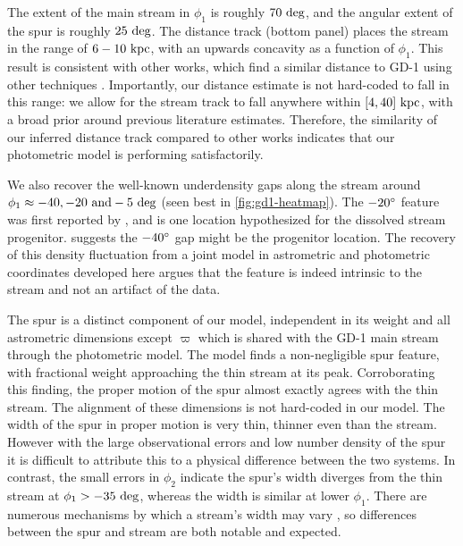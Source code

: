 \documentclass[twocolumn]{aastex631}
\newcommand{\stream}[1]{#1}
\newcommand{\parallax}{\varpi}
\begin{document}
        The extent of the main stream in $\phi_1$ is roughly $70~\rm{deg}$, and
        the angular extent of the spur is roughly $25~\rm{deg}$. The distance
        track (bottom panel) places the stream in the range of $6-10~\rm{kpc}$,
        with an upwards concavity as a function of $\phi_1$. This result is
        consistent with other works, which find a similar distance to
        \stream{GD-1} using other techniques \citep{deBoer+2020, Ibata+2021}.
        Importantly, our distance estimate is not hard-coded to fall in this
        range: we allow for the stream track to fall anywhere within
        $[4,40]~\rm{kpc}$, with a broad prior around previous literature
        estimates. Therefore, the similarity of our inferred distance track
        compared to other works indicates that our photometric model is
        performing satisfactorily.

        We also recover the well-known underdensity gaps along the stream around
        $\phi_1 \approx -40, -20 \ \rm{and } -5~\rm{deg}$ (seen best in
        \autoref{fig:gd1-heatmap}). The $-20\degree$ feature was first reported
        by \citet{CarlbergGrillmair2013}, and is one location hypothesized for
        the dissolved stream progenitor. \citep{WebbBovy2019} suggests the
        $-40\degree$ gap might be  the progenitor location.  The recovery of
        this density fluctuation from a joint model in astrometric and
        photometric coordinates developed here argues that the feature is indeed
        intrinsic to the stream and not an artifact of the data.

        The spur is a distinct component of our model, independent in its weight
        and all astrometric dimensions except $\parallax$ which is shared with
        the \stream{GD-1} main stream through the photometric model. The model
        finds a non-negligible spur feature, with fractional weight approaching
        the thin stream at its peak. Corroborating this finding, the proper
        motion of the spur almost exactly agrees with the thin stream. The
        alignment of these dimensions is not hard-coded in our model. The width
        of the spur in proper motion is very thin, thinner even than the stream.
        However with the large observational errors and low number density of
        the spur it is difficult to attribute this to a physical difference
        between the two systems. In contrast, the small errors in $\phi_2$
        indicate the spur's width diverges from the thin stream at $\phi_1 > -35
        \ \rm{deg}$, whereas the width is similar at lower $\phi_1$. There are
        numerous mechanisms by which a stream's width may vary \citep[e.g.
        epicyclic effects as in][]{Ibata+2020}, so differences between the spur
        and stream are both notable and expected.
\end{document}
